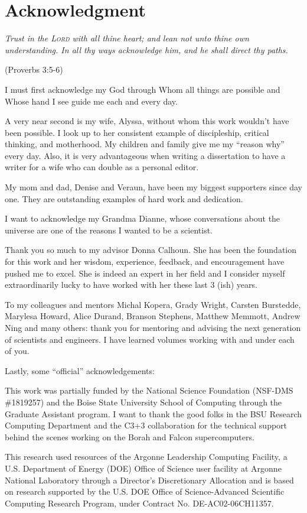 \chapter*{Acknowledgment}

\begin{center}
{\em Trust in the \textsc{Lord} with all thine heart; and lean not unto thine own understanding. In all thy ways acknowledge him, and he shall direct thy paths.}

(Proverbs 3:5-6)
\end{center}

I must first acknowledge my God through Whom all things are possible and Whose hand I see guide me each and every day.

A very near second is my wife, Alyssa, without whom this work wouldn't have been possible. I look up to her consistent example of discipleship, critical thinking, and motherhood. My children and family give me my ``reason why'' every day. Also, it is very advantageous when writing a dissertation to have a writer for a wife who can double as a personal editor.

My mom and dad, Denise and Veraun, have been my biggest supporters since day one. They are outstanding examples of hard work and dedication.

I want to acknowledge my Grandma Dianne, whose conversations about the universe are one of the reasons I wanted to be a scientist.

Thank you so much to my advisor Donna Calhoun. She has been the foundation for this work and her wisdom, experience, feedback, and encouragement have pushed me to excel. She is indeed an expert in her field and I consider myself extraordinarily lucky to have worked with her these last 3 (ish) years.

To my colleagues and mentors Michal Kopera, Grady Wright, Carsten Burstedde, Marylesa Howard, Alice Durand, Branson Stephens, Matthew Memmott, Andrew Ning and many others: thank you for mentoring and advising the next generation of scientists and engineers. I have learned volumes working with and under each of you.

Lastly, some ``official'' acknowledgements:

This work was partially funded by the National Science Foundation (NSF-DMS \#1819257) and the Boise State University School of Computing through the Graduate Assistant program. I want to thank the good folks in the BSU Research Computing Department and the C3+3 collaboration for the technical support behind the scenes working on the Borah and Falcon supercomputers.

This research used resources of the Argonne Leadership Computing Facility, a U.S. Department of Energy (DOE) Office of Science user facility at Argonne National Laboratory through a Director's Discretionary Allocation and is based on research supported by the U.S. DOE Office of Science-Advanced Scientific Computing Research Program, under Contract No. DE-AC02-06CH11357.


